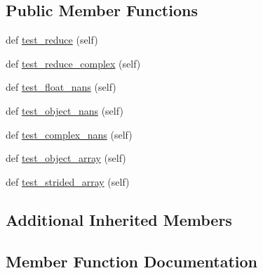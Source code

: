 \subsection*{Public Member Functions}
\begin{DoxyCompactItemize}
\item 
def \hyperlink{classnumpy_1_1core_1_1tests_1_1test__umath_1_1TestMaximum_a83a38675edff05564fa127fd17a933d9}{test\+\_\+reduce} (self)
\item 
def \hyperlink{classnumpy_1_1core_1_1tests_1_1test__umath_1_1TestMaximum_a66b855890e6269e828a6bc6dcb04e740}{test\+\_\+reduce\+\_\+complex} (self)
\item 
def \hyperlink{classnumpy_1_1core_1_1tests_1_1test__umath_1_1TestMaximum_a1d04e1cbb21aa5cb5a0e48d25cfb738f}{test\+\_\+float\+\_\+nans} (self)
\item 
def \hyperlink{classnumpy_1_1core_1_1tests_1_1test__umath_1_1TestMaximum_a66094bff691b98e4eeea1cfc90dea1aa}{test\+\_\+object\+\_\+nans} (self)
\item 
def \hyperlink{classnumpy_1_1core_1_1tests_1_1test__umath_1_1TestMaximum_a4b2ecf04c965a4148cdf5640f3b5e262}{test\+\_\+complex\+\_\+nans} (self)
\item 
def \hyperlink{classnumpy_1_1core_1_1tests_1_1test__umath_1_1TestMaximum_af4cd20effeb8c78776c4637e021a6398}{test\+\_\+object\+\_\+array} (self)
\item 
def \hyperlink{classnumpy_1_1core_1_1tests_1_1test__umath_1_1TestMaximum_aea7ac1fc9cb5e815cb30a38a39896084}{test\+\_\+strided\+\_\+array} (self)
\end{DoxyCompactItemize}
\subsection*{Additional Inherited Members}


\subsection{Member Function Documentation}
\mbox{\label{classnumpy_1_1core_1_1tests_1_1test__umath_1_1TestMaximum_a4b2ecf04c965a4148cdf5640f3b5e262}} 
